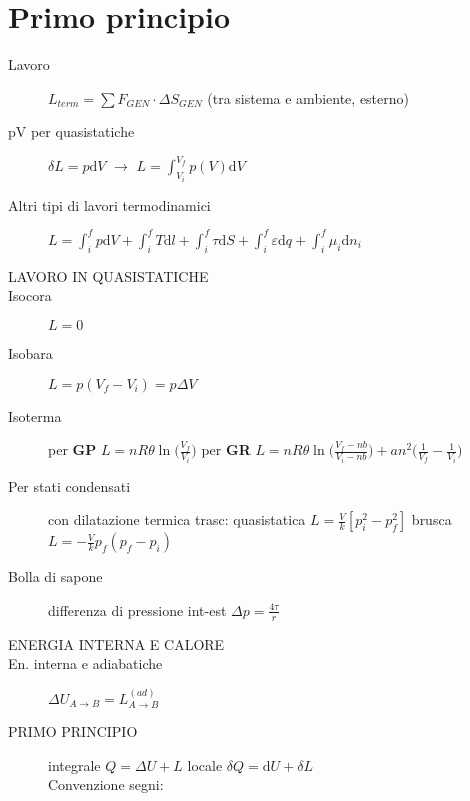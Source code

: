\documentclass[10pt, oneside]{article}
\begin{document}
\section{Primo principio}
\begin{description}
\item[Lavoro] $\displaystyle L_{term} = \sum F_{GEN} \cdot \Delta S_{GEN}$ (tra sistema e ambiente, esterno)
\item[pV per quasistatiche] $\displaystyle \delta L = p \mathrm{d}V$ $\rightarrow$ $\displaystyle L = \int_{V_i}^{V_f}p(V)\mathrm{d}V$
\item[Altri tipi di lavori termodinamici] $\displaystyle L = \int_{i}^{f}p\mathrm{d}V + \int_{i}^{f}T \mathrm{d}l + \int_{i}^{f}\tau \mathrm{d}S + \int_{i}^{f}\varepsilon \mathrm{d}q + \int_{i}^{f}\mu_i \mathrm{d}n_i$
\item[\large LAVORO IN QUASISTATICHE]
\item[Isocora] $\displaystyle L = 0$
\item[Isobara] $\displaystyle L = p(V_f - V_i) = p \Delta V$
\item[Isoterma] per \textbf{GP} $\displaystyle L = nR \theta \ln \big(\frac{V_f}{V_i}\big)$ per \textbf{GR} $\displaystyle L = nR\theta \ln \bigg(\frac{V_f - nb}{V_i - nb}\bigg) + an^2 \big(\frac{1}{V_f} - \frac{1}{V_i}\big)$
\item[Per stati condensati] con dilatazione termica trasc: quasistatica $\displaystyle L = \frac{V}{k}[p_i^2 - p_f^2]$ brusca $\displaystyle L = - \frac{V}{k} p_f(p_f - p_i)$
\item[Bolla di sapone] differenza di pressione int-est $\displaystyle \Delta p = \frac{4 \tau}{r}$ 
\item[\large ENERGIA INTERNA E CALORE]
\item[En. interna e adiabatiche] $\displaystyle \Delta U_{A \rightarrow B} = L^{(ad)}_{A \rightarrow B}$
\item[PRIMO PRINCIPIO] integrale $\boxed{\displaystyle Q = \Delta U + L}$ locale $\boxed{\displaystyle \delta Q = \mathrm{d}U + \delta L}$
\\Convenzione segni:
\begin{center}
\end{center}
\end{description}
\end{document}
